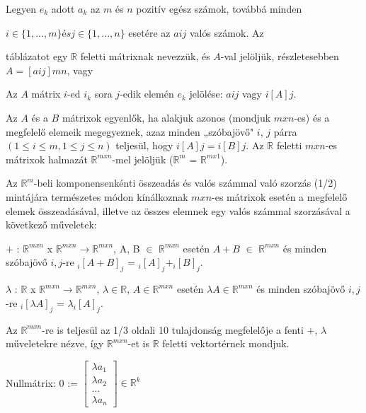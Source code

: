	\begin{frame}

	\begin{tcolorbox}[title={Def.: Mátrix}]	
		Legyen $e_k$ adott $a_k$ az $m$ és $n$ pozitív egész számok, továbbá minden
	
		$i \in \{1, ..., m\} és j \in \{1, ..., n\}$ esetére az $aij$ valós számok. Az
		
		táblázatot egy $\mathbb{R}$ feletti mátrixnak nevezzük, és $A$-val jelöljük, részletesebben $A = [aij]mn$, vagy
		
		Az $A$ mátrix $i$-ed $i_k$ sora $j$-edik elemén $e_k$ jelölése: $aij$ vagy $i[A]j$.
	\end{tcolorbox}
	
	\begin{tcolorbox}[title={Def.: Mátrixok egyenlősége}]	
		Az $A$ és a $B$ mátrixok egyenlők, ha alakjuk azonos (mondjuk $m x n$-es) és a megfelelő elemeik megegyeznek, azaz minden „szóbajövő" $i$, $j$ párra $(1 \leq i \leq m, 1 \leq j \leq n)$ teljesül, hogy $i[A]j = i[B]j$. Az $\mathbb{R}$ feletti $m x n$-es mátrixok halmazát $\mathbb{R}^{m x n}$-mel jelöljük ($\mathbb{R}^{m}$ = $\mathbb{R}^{m x 1}$).
	\end{tcolorbox}
	
	\begin{tcolorbox}[title={Def.: Mátrix összeadás, számmal való szorzás}]	
		Az $\mathbb{R}^{m}$-beli komponensenkénti összeadás és valós számmal való szorzás (1/2) mintájára természetes módon kínálkoznak $m x n$-es mátrixok esetén a megfelelő elemek összeadásával, illetve az összes elemnek egy valós számmal szorzásával a következő műveletek:

$+$ : $\mathbb{R}^{m x n}$ x $\mathbb{R}^{m x n} \rightarrow \mathbb{R}^{m x n}$, A, B $\in$ $\mathbb{R}^{m x n}$ esetén $A + B$ $\in$ $\mathbb{R}^{m x n}$ és minden szóbajövő
$i, j$-re $_{i} [A + B]_j$ = $_{i} [A]_j + _{i} [B]_j$.

${\lambda}$ : $\mathbb{R}$ x $\mathbb{R}^{m x n} \rightarrow \mathbb{R}^{m x n}$, ${\lambda} \in \mathbb{R}$, $A \in \mathbb{R}^{m x n}$ esetén ${\lambda}A \in \mathbb{R}^{m x n}$ és minden szóbajövő $i, j$-re $_{i} [{\lambda}A]_j$ = ${\lambda} _{i} [A]_j$.

Az $\mathbb{R}^{m x n}$-re is teljesül az 1/3 oldali 10 tulajdonság megfelelője a fenti $+$, ${\lambda}$ műveletekre nézve, így $\mathbb{R}^{m x n}$-et is $\mathbb{R}$ feletti vektortérnek mondjuk.
	\end{tcolorbox}	
	
	\begin{tcolorbox}[title={Def.: Nullmátrix}]	
		Nullmátrix: 0 := $\begin{bmatrix}
					{\lambda}a_1 \\
					{\lambda}a_2 \\
					... \\
					{\lambda}a_n
				\end{bmatrix} \in \mathbb{R}^k$
	\end{tcolorbox}		
	
	\end{frame}
	
